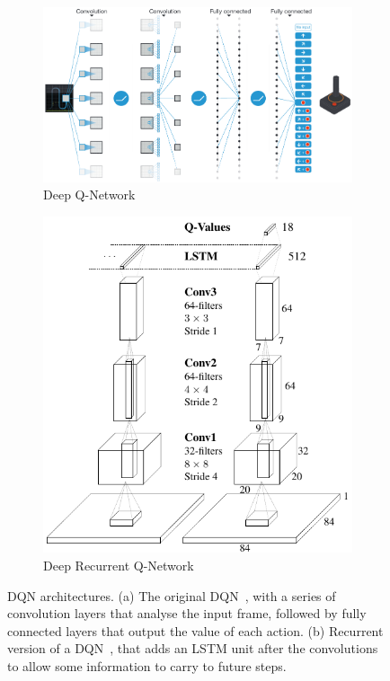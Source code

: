 \begin{figure}
    \centering
    \hfill
    \begin{subfigure}[b]{0.64\textwidth}
        \centering
        \includegraphics[width=\textwidth]{Figures/RL/dqn.png}
        \caption{Deep Q-Network}
        \label{fig:dqn}
    \end{subfigure}
    \hfill
    \begin{subfigure}[b]{0.35\textwidth}
        \centering
        \includegraphics[width=\textwidth]{Figures/RL/drqn.png}
        \caption{Deep Recurrent Q-Network}
        \label{fig:drqn}
    \end{subfigure}
    \caption{DQN architectures. (a) The original DQN~\citep{Mnih2015_DQN}, with a series of convolution layers that analyse the input frame, followed by fully connected layers that output the value of each action. (b) Recurrent version of a DQN~\citep{Hausknecht2015_DRQN}, that adds an LSTM unit after the convolutions to allow some information to carry to future steps.}
    \label{fig:dqns}
\end{figure}



